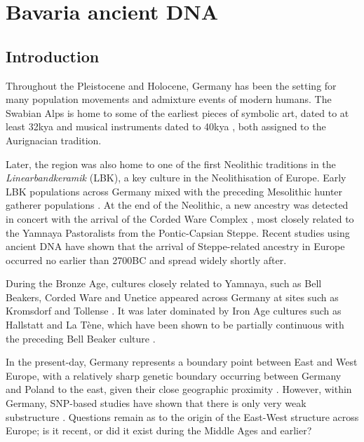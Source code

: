 \chapter{Bavaria ancient DNA}
\label{chapterlabel4}

\section{Introduction}

Throughout the Pleistocene and Holocene, Germany has been the setting for many population movements and admixture events of modern humans. The Swabian Alps is home to some of the earliest pieces of symbolic art, dated to at least 32kya \cite{conard2009female} and musical instruments dated to 40kya \cite{conard2009new}, both assigned to the Aurignacian tradition. 

Later, the region was also home to one of the first Neolithic traditions in the \textit{Linearbandkeramik} (LBK), a key culture in the Neolithisation of Europe. Early LBK populations across Germany mixed with the preceding Mesolithic hunter gatherer populations \cite{Lipson2017b, mathieson2015genome, Haak2015,gunther2015ancient, Hofmanova2016}. At the end of the Neolithic, a new ancestry was detected \cite{Haak2015, Allentoft2015}  in concert with the arrival of the Corded Ware Complex \cite{furholt2003absolutchronologische}, most closely related to the Yamnaya Pastoralists from the Pontic-Capsian Steppe. Recent studies using ancient DNA have shown that the arrival of Steppe-related ancestry in Europe occurred no earlier than 2700BC \cite{furtwangler2020ancient} and spread widely shortly after.

During the Bronze Age, cultures closely related to Yamnaya, such as Bell Beakers, Corded Ware and Unetice \cite{Haak2015} appeared across Germany at sites such as Kromsdorf \cite{lee2012emerging} and Tollense \cite{jantzen2011bronze, brinker2013human}. It was later dominated by Iron Age cultures such as Hallstatt and La Tène, which have been shown to be partially continuous with the preceding Bell Beaker culture \cite{Brunel12791}. 
 
In the present-day, Germany represents a boundary point between East and West Europe, with a relatively sharp genetic boundary occurring between Germany and Poland to the east, given their close geographic proximity \cite{novembre2008genes, kayser2005significant, veeramah2011genetic}. However, within Germany, SNP-based studies have shown that there is only very weak substructure \cite{steffens2006snp}. Questions remain as to the origin of the East-West structure across Europe; is it recent, or did it exist during the Middle Ages and earlier? 

